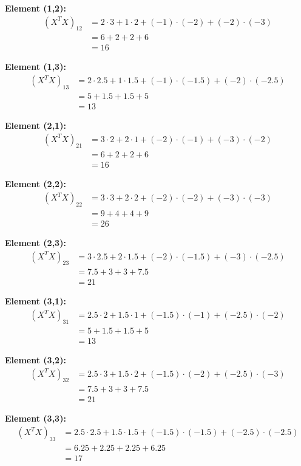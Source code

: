 \documentclass[12pt]{article}
\begin{document}
\begin{solution}
\textbf{Element (1,2):}
\begin{align*}
(X^T X)_{12} &= 2 \cdot 3 + 1 \cdot 2 + (-1) \cdot (-2) + (-2) \cdot (-3) \\
&= 6 + 2 + 2 + 6 \\
&= 16
\end{align*}

\textbf{Element (1,3):}
\begin{align*}
(X^T X)_{13} &= 2 \cdot 2.5 + 1 \cdot 1.5 + (-1) \cdot (-1.5) + (-2) \cdot (-2.5) \\
&= 5 + 1.5 + 1.5 + 5 \\
&= 13
\end{align*}

\textbf{Element (2,1):}
\begin{align*}
(X^T X)_{21} &= 3 \cdot 2 + 2 \cdot 1 + (-2) \cdot (-1) + (-3) \cdot (-2) \\
&= 6 + 2 + 2 + 6 \\
&= 16
\end{align*}

\textbf{Element (2,2):}
\begin{align*}
(X^T X)_{22} &= 3 \cdot 3 + 2 \cdot 2 + (-2) \cdot (-2) + (-3) \cdot (-3) \\
&= 9 + 4 + 4 + 9 \\
&= 26
\end{align*}

\textbf{Element (2,3):}
\begin{align*}
(X^T X)_{23} &= 3 \cdot 2.5 + 2 \cdot 1.5 + (-2) \cdot (-1.5) + (-3) \cdot (-2.5) \\
&= 7.5 + 3 + 3 + 7.5 \\
&= 21
\end{align*}

\textbf{Element (3,1):}
\begin{align*}
(X^T X)_{31} &= 2.5 \cdot 2 + 1.5 \cdot 1 + (-1.5) \cdot (-1) + (-2.5) \cdot (-2) \\
&= 5 + 1.5 + 1.5 + 5 \\
&= 13
\end{align*}

\textbf{Element (3,2):}
\begin{align*}
(X^T X)_{32} &= 2.5 \cdot 3 + 1.5 \cdot 2 + (-1.5) \cdot (-2) + (-2.5) \cdot (-3) \\
&= 7.5 + 3 + 3 + 7.5 \\
&= 21
\end{align*}

\textbf{Element (3,3):}
\begin{align*}
(X^T X)_{33} &= 2.5 \cdot 2.5 + 1.5 \cdot 1.5 + (-1.5) \cdot (-1.5) + (-2.5) \cdot (-2.5) \\
&= 6.25 + 2.25 + 2.25 + 6.25 \\
&= 17
\end{align*}


\end{solution}
\end{document}
